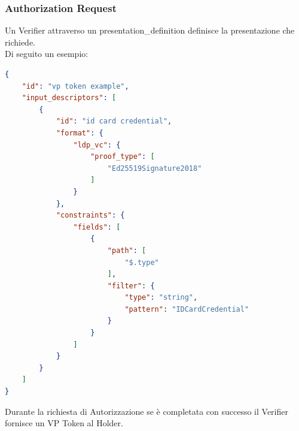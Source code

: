 \subsubsection{Authorization Request}
Un Verifier attraverso un presentation\_definition definisce la presentazione che richiede.\\
Di seguito un esempio:
\begin{lstlisting}[language=json,firstnumber=1]
{
    "id": "vp token example",
    "input_descriptors": [
        {
            "id": "id card credential",
            "format": {
                "ldp_vc": {
                    "proof_type": [
                        "Ed25519Signature2018"
                    ]
                }
            },
            "constraints": {
                "fields": [
                    {
                        "path": [
                            "$.type"
                        ],
                        "filter": {
                            "type": "string",
                            "pattern": "IDCardCredential"
                        }
                    }
                ]
            }
        }
    ]
}
\end{lstlisting}

Durante la richiesta di Autorizzazione se è completata con successo il Verifier fornisce un VP Token al Holder.
\\
